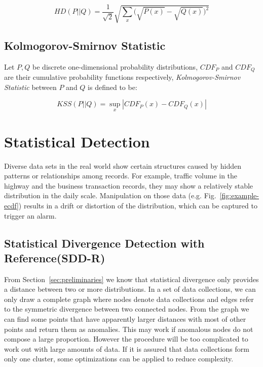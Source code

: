 \documentclass[10pt,conference,letterpaper]{article}
\begin{document}
			\begin{equation}
				HD(P||Q) = \frac{1}{\sqrt{2}}\sqrt{\sum_x\bigg(\sqrt{P(x)} - \sqrt{Q(x)}\bigg)^2}
			\end{equation}
		
		\subsection{Kolmogorov-Smirnov Statistic}
			Let $P,Q$ be discrete one-dimensional probability distributions, $CDF_P$ and $CDF_Q$ are their cumulative probability functions respectively, \textit{Kolmogorov-Smirnov Statistic} between $P$ and $Q$ is defined to be:
			
			\begin{equation}
				KSS(P||Q) = \sup_x | CDF_P(x) - CDF_Q(x) |
			\end{equation}
			
	
	\section{Statistical Detection}\label{sec:algorithm-details}
	
		Diverse data sets in the real world show certain structures caused by hidden patterns or relationships among records. For example, traffic volume in the highway and the business transaction records, they may show a relatively stable distribution in the daily scale. Manipulation on those data (e.g. Fig.~\ref{fig:example-ecdf}) results in a drift or distortion of the distribution, which can be captured to trigger an alarm.
	
		\subsection{Statistical Divergence Detection with Reference(SDD-R)}\label{sec:alg-opt-reference}
			From Section~\ref{sec:preliminaries} we know that statistical divergence only provides a distance between two or more distributions. In a set of data collections, we can only draw a complete graph where nodes denote data collections and edges refer to the symmetric divergence between two connected nodes. From the graph we can find some points that have apparently larger distances with most of other points and return them as anomalies. This may work if anomalous nodes do not compose a large proportion. However the procedure will be too complicated to work out with large amounts of data. If it is assured that data collections form only one cluster, some optimizations can be applied to reduce complexity.
		
\end{document}
